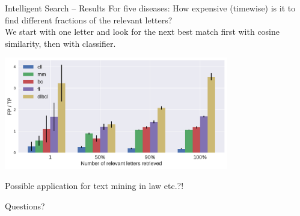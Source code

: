\documentclass[10pt]{beamer}
\begin{document}
\begin{frame}{Intelligent Search -- Results}
	For five diseases: How expensive (timewise) is it to find different fractions of the relevant letters?\\
	We start with one letter and look for the next best match first with cosine similarity, then with classifier.
	\begin{center}
		\includegraphics[height=4.9cm]{intelligent_search}
	\end{center}
	Possible application for text mining in law etc.?!
\end{frame}

\begin{frame}[standout]
  Questions?
\end{frame}

\appendix
\end{document}
